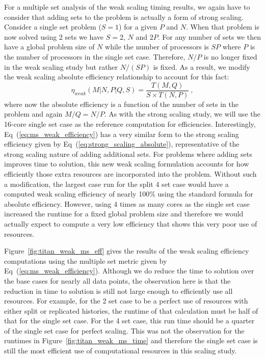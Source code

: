For a multiple set analysis of the weak scaling timing results, we
again have to consider that adding sets to the problem is actually a
form of strong scaling. Consider a single set problem ($S=1$) for a
given $P$ and $N$. When that problem is now solved using 2 sets we
have $S=2$, $N$ and $2P$. For any number of sets we then have a global
problem size of $N$ while the number of processors is $SP$ where $P$
is the number of processors in the single set case. Therefore, $N/P$
is no longer fixed in the weak scaling study but rather $N/(SP)$ is
fixed. As a result, we modify the weak scaling absolute efficiency
relationship to account for this fact:
\begin{equation}
\eta_{weak}(M|N,P|Q,S) = \frac{T(M,Q)}{S \times T(N,P)}\:,
  \label{eq:ms_weak_efficiency}
\end{equation}
where now the absolute efficiency is a function of the number of sets
in the problem and again $M/Q = N/P$. As with the strong scaling
study, we will use the 16-core single set case as the reference
computation for efficiencies. Interestingly,
Eq~(\ref{eq:ms_weak_efficiency}) has a very similar form to the strong
scaling efficiency given by Eq~(\ref{eq:strong_scaling_absolute}),
representative of the strong scaling nature of adding additional
sets. For problems where adding sets improves time to solution, this
new weak scaling formulation accounts for how efficiently those extra
resources are incorporated into the problem. Without such a
modification, the largest case run for the split 4 set case would have
a computed weak scaling efficiency of nearly 100\% using the standard
formula for absolute efficiency. However, using 4 times as many cores
as the single set case increased the runtime for a fixed global
problem size and therefore we would actually expect to compute a very
low efficiency that shows this very poor use of resources.

Figure~\ref{fig:titan_weak_ms_eff} gives the results of the weak
scaling efficiency computations using the multiple set metric given by
Eq~(\ref{eq:ms_weak_efficiency}). Although we do reduce the time to
solution over the base cases for nearly all data points, the
observation here is that the reduction in time to solution is still
not large enough to efficiently use all resources. For example, for
the 2 set case to be a perfect use of resources with either split or
replicated histories, the runtime of that calculation must be half of
that for the single set case. For the 4 set case, this run time should
be a quarter of the single set case for perfect scaling. This was not
the observation for the runtimes in
Figure~\ref{fig:titan_weak_ms_time} and therefore the single set case
is still the most efficient use of computational resources in this
scaling study.

